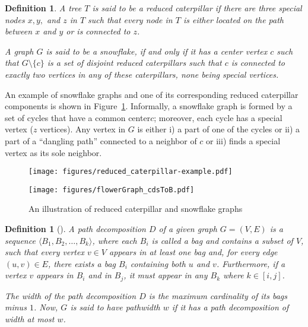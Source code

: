 \documentclass[letterpaper,11pt]{article}
\newtheorem{definition}[theorem]{Definition}
\newcommand{\flower}{snowflake\xspace}
\newcommand{\pistil}{center\xspace}
\newcommand{\cater}{reduced caterpillar\xspace}
\begin{document}
\begin{definition}
\label{def:ourflowergraph}
A tree $T$ is said to be a \emph{\cater} if there are three special nodes $x, y,$ and $z$ in $T$ such that every node in $T$ is either located on the path between $x$ and $y$ or is connected to $z$. 

A graph $G$ is said to be a \flower, if and only if it has a \pistil vertex $c$ such that $G\setminus \{c\}$ is a set of disjoint reduced caterpillars 
such that $c$ is
connected to exactly two vertices in any of these caterpillars, none being special vertices.
\end{definition}

An example of \flower graphs and one of its corresponding reduced caterpillar components is shown in Figure~\ref{fig:flowergraphs_example}. Informally, a \flower graph is formed by a set of cycles that have a common \pistil $c$; moreover, each cycle has a special vertex ($z$ vertices). Any vertex in $G$ is either 
i) a part of one of the cycles or 
ii) a part of a ``dangling path'' connected to a neighbor of $c$ or 
iii) finds a special vertex as its sole neighbor.  


\begin{figure}
    \centering
    \begin{minipage}[b]{0.42\textwidth}
        \centering
        \texttt{[image: figures/reduced\_caterpillar-example.pdf]}  \label{fig:flowerGraph_caterpillar}
    \end{minipage}
    \hfill
    \begin{minipage}[b]{0.52\textwidth}
        \centering
        \texttt{[image: figures/flowerGraph\_cdsToB.pdf]} \subcaption{An example of a \flower graph} \label{fig:flowerGraph_cdsToB}
    \end{minipage}
    \caption{An illustration of reduced caterpillar and \flower graphs}
    \label{fig:flowergraphs_example}
\end{figure}

\newcommand{\tsub}{\textsubscript}

\begin{definition}[\cite{robertson1983pathwidth}]
A path decomposition $D$ of a given graph $G = (V,E)$ 
    is a sequence $\langle B_1, B_2, \dots, B_k\rangle$, where each $B_i$ is called a bag and contains a subset of $V$, such that every vertex $v \in V$ appears in at least one bag and, for every edge $(u, v) \in E$, there exists a bag $B_i$ containing both $u$ and $v$. Furthermore, 
    if a vertex $v$ appears in $B_i$ and in $B_j$, it must appear in any $B_k$ where $k\in[i,j]$.

    The width of the path decomposition $D$ is the maximum cardinality of its bags minus $1$. Now, $G$ is said to have pathwidth $w$ if it has a path decomposition of width at most $w$. 
\end{definition}
\end{document}
